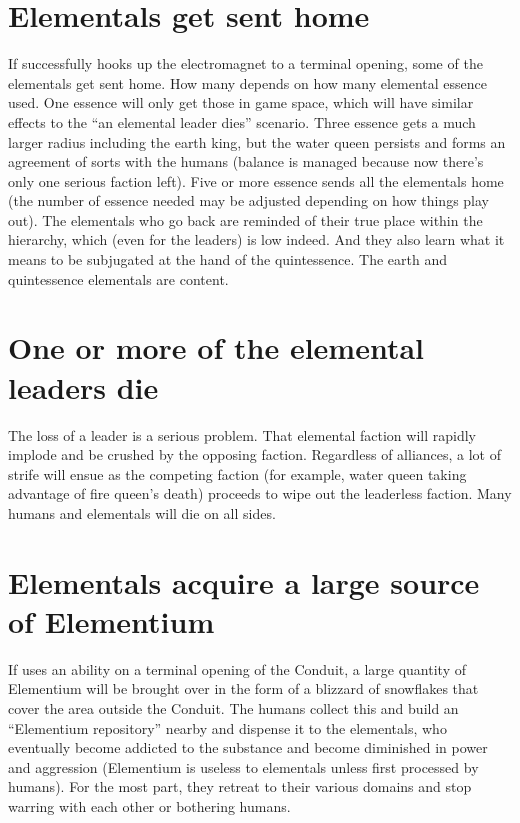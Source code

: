 \documentclass[green]{elementals}
\begin{document}
\name{\gEndGame{}}


\section{Elementals get sent home}

If \cGD{\intro} successfully hooks up the electromagnet to a terminal opening, some of the elementals get sent home. How many depends on how many elemental essence \cGD{} used. One essence will only get those in game space, which will have similar effects to the ``an elemental leader dies'' scenario. Three essence gets a much larger radius including the earth king, but the water queen persists and forms an agreement of sorts with the humans (balance is managed because now there's only one serious faction left). Five or more essence sends all the elementals home (the number of essence needed may be adjusted depending on how things play out). The elementals who go back are reminded of their true place within the hierarchy, which (even for the leaders) is low indeed. And they also learn what it means to be subjugated at the hand of the quintessence. The earth and quintessence elementals are content.

\section{One or more of the elemental leaders die}

The loss of a leader is a serious problem. That elemental faction will rapidly implode and be crushed by the opposing faction. Regardless of alliances, a lot of strife will ensue as the competing faction (for example, water queen taking advantage of fire queen's death) proceeds to wipe out the leaderless faction. Many humans and elementals will die on all sides.

\section{Elementals acquire a large source of Elementium}

If \cScientist{\intro} uses an ability on a terminal opening of the Conduit, a large quantity of Elementium will be brought over in the form of a blizzard of snowflakes that cover the area outside the Conduit. The humans collect this and build an ``Elementium repository'' nearby and dispense it to the elementals, who eventually become addicted to the substance and become diminished in power and aggression (Elementium is useless to elementals unless first processed by humans). For the most part, they retreat to their various domains and stop warring with each other or bothering humans.
\end{document}
